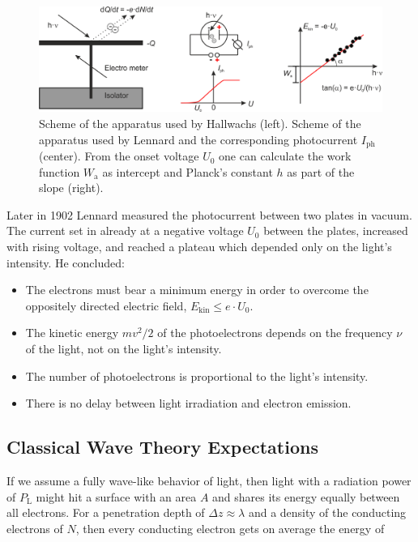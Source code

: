 \documentclass[
  a4paper,
]{book}
\begin{document}
\begin{figure}[H]

{\centering \includegraphics[width=0.9\linewidth,height=\textheight,keepaspectratio]{quantum-mechanics/img/Lecture21_Hallwachs.png}

}

\caption{Scheme of the apparatus used by Hallwachs (left). Scheme of the
apparatus used by Lennard and the corresponding photocurrent
\(I_{\mathrm{ph}}\) (center). From the onset voltage \(U_0\) one can
calculate the work function \(W_{\mathrm{a}}\) as intercept and Planck's
constant \(h\) as part of the slope (right).}

\end{figure}%

Later in 1902 Lennard measured the photocurrent between two plates in
vacuum. The current set in already at a negative voltage \(U_0\) between
the plates, increased with rising voltage, and reached a plateau which
depended only on the light's intensity. He concluded:

\begin{itemize}
\item
  The electrons must bear a minimum energy in order to overcome the
  oppositely directed electric field,
  \(E_{\mathrm{kin}} \le e \cdot U_0\).
\item
  The kinetic energy \(m v^2/2\) of the photoelectrons depends on the
  frequency \(\nu\) of the light, not on the light's intensity.
\item
  The number of photoelectrons is proportional to the light's intensity.
\item
  There is no delay between light irradiation and electron emission.
\end{itemize}

\subsection{Classical Wave Theory
Expectations}\label{classical-wave-theory-expectations}

If we assume a fully wave-like behavior of light, then light with a
radiation power of \(P_{\mathrm{L}}\) might hit a surface with an area
\(A\) and shares its energy equally between all electrons. For a
penetration depth of \(\Delta z \approx \lambda\) and a density of the
conducting electrons of \(N\), then every conducting electron gets on
average the energy of
\end{document}
